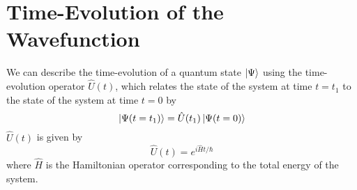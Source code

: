 %
%
%

\section*{Time-Evolution of the Wavefunction}

	We can describe the time-evolution of a quantum state $\ket{\Psi}$ using the time-evolution operator $\hat U (t)$, which relates the state of the system at time $t=t_1$ to the state of the system at time $t=0$ by
	\begin{equation*}
		\ket{\Psi(t=t_1)} = \hat U(t_1) \ket{\Psi(t=0)}
	\end{equation*}
	$\hat U(t)$ is given by 
	\begin{equation*}
		\hat U(t) = e^{i\hat H t/\hbar}
	\end{equation*}
	where $\hat H$ is the Hamiltonian operator corresponding to the total energy of the system.
	
